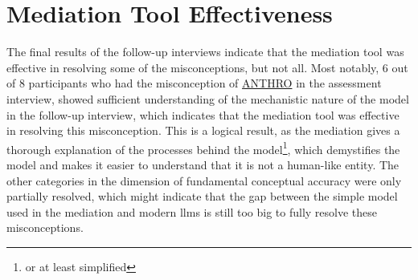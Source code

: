 \section{Mediation Tool Effectiveness}
The final results of the follow-up interviews indicate that the mediation tool was effective in resolving some of the misconceptions, but not all. Most notably, 6 out of 8 participants who had the misconception of \hyperref[anthro]{ANTHRO} in the assessment interview, showed sufficient understanding of the mechanistic nature of the model in the follow-up interview, which indicates that the mediation tool was effective in resolving this misconception. This is a logical result, as the mediation gives a thorough explanation of the processes behind the model\footnote{or at least simplified}, which demystifies the model and makes it easier to understand that it is not a human-like entity. The other categories in the dimension of fundamental conceptual accuracy were only partially resolved, which might indicate that the gap between the simple model used in the mediation and modern \gls{llms} is still too big to fully resolve these misconceptions.


